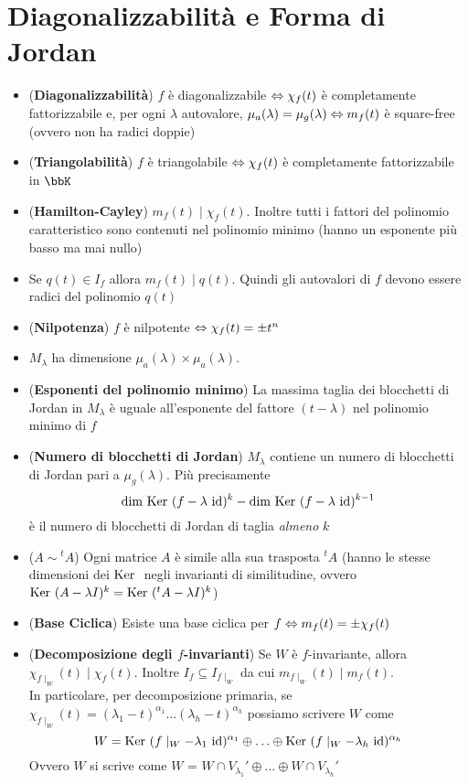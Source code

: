 \documentclass[a4paper,NoNotes,GeneralMath]{stdmdoc}
\begin{document}
	\section*{Diagonalizzabilità e Forma di Jordan}
	\begin{itemize}
		\item ({\bf Diagonalizzabilità}) $f$ è diagonalizzabile $\Leftrightarrow \chi_f(t)$ è completamente fattorizzabile e, per ogni $\lambda$ autovalore, $\mu_a(\lambda) = \mu_g(\lambda) \Leftrightarrow m_f(t)$ è square-free (ovvero non ha radici doppie)
		\item ({\bf Triangolabilità}) $f$ è triangolabile $\Leftrightarrow \chi_f(t)$ è completamente fattorizzabile in $\bbK$
		\item ({\bf Hamilton-Cayley}) $m_f(t) \mid \chi_f(t)$. Inoltre tutti i fattori del polinomio caratteristico sono contenuti nel polinomio minimo (hanno un esponente più basso ma mai nullo)
		\item Se $q(t) \in I_f$ allora $m_f(t) \mid q(t)$. Quindi gli autovalori di $f$ devono essere radici del polinomio $q(t)$	
		\item ({\bf Nilpotenza}) $f$ è nilpotente $\Leftrightarrow \chi_f(t) = \pm t^n$
		\item $M_\lambda$ ha dimensione $\mu_a(\lambda)\times\mu_a(\lambda)$.
		\item ({\bf Esponenti del polinomio minimo}) La massima taglia dei blocchetti di Jordan in $M_\lambda$ è uguale all'esponente del fattore $(t-\lambda)$ nel polinomio minimo di $f$
		\item ({\bf Numero di blocchetti di Jordan}) $M_\lambda$ contiene un numero di blocchetti di Jordan pari a $\mu_g(\lambda)$. Più precisamente $$\Dim\Ker (f-\lambda\ \Id)^k-\Dim\Ker (f-\lambda\ \Id)^{k-1}$$ è il numero di blocchetti di Jordan di taglia {\it almeno} $k$
		\item ({\bf $A \sim {}^tA$}) Ogni matrice $A$ è simile alla sua trasposta ${}^tA$ (hanno le stesse dimensioni dei $\mbox{Ker }$ negli invarianti di similitudine, ovvero $\mbox{Ker } (A-\lambda I)^k = \mbox{Ker } ({}^tA-\lambda I)^k$)
		\item ({\bf Base Ciclica}) Esiste una base ciclica per $f \Leftrightarrow m_f(t) = \pm \chi_f(t)$
		\item ({\bf Decomposizione degli $f$-invarianti}) Se $W$ è $f$-invariante, allora $\chi_{f\mid_W}(t) \mid \chi_f(t)$. Inoltre $I_f \subseteq I_{f\mid_W}$ da cui $m_{f\mid_W}(t) \mid m_f(t)$. \\ In particolare, per decomposizione primaria, se $\chi_{f\mid_W}(t) = (\lambda_1-t)^{\alpha_1}\ldots(\lambda_h-t)^{\alpha_h}$ possiamo scrivere $W$ come $$W = \Ker (f\mid_W-\lambda_1\ \Id)^{\alpha_1} \oplus \ldots \oplus \Ker (f\mid_W-\lambda_h\ \Id)^{\alpha_h}$$ Ovvero $W$ si scrive come $W$ = $W\cap V_{\lambda_1}' \oplus \ldots \oplus W\cap V_{\lambda_h}'$ \\

\end{itemize}
\end{document}
